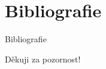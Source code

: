 \documentclass[
  aspectratio=169,
]{beamer}
\begin{document}
\section{Bibliografie}

\begin{frame}{Bibliografie}

\end{frame}

\begin{frame}[plain]
\vfill
\centerline{Děkuji za pozornost!}
\vfill\vfill
\end{frame}
\end{document}
